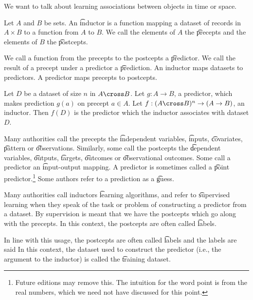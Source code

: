 

We want to talk about learning
associations between objects
in time or space.


Let $A$ and $B$ be sets.
An \t{inductor} is a function mapping a dataset of records in $A \times B$ to a function from $A$ to $B$.
We call the elements of $A$ the \t{precepts} and the elements of $B$ the \t{postcepts}.

We call a function from the precepts to the postcepts a \t{predictor}.
We call the result of a precept under a predictor a \t{prediction}.
An inductor maps datasets to predictors.
A predictor maps precepts to postcepts.


Let $D$ be a dataset of size $n$ in $A \cross B$.
Let $g: A \to B$, a predictor, which makes prediction $g(a)$ on precept $a \in A$.
Let $f: (A \cross B)^n \to (A \to B)$, an inductor.
Then $f(D)$ is the predictor which the inductor associates with dataset $D$.


Many authorities call the precepts the \t{independent variables}, \t{inputs}, \t{covariates}, \t{pattern} or \t{observations}.
Similarly, some call the postcepts the \t{dependent variables}, \t{outputs}, \t{targets}, \t{outcomes} or \t{observational outcomes}.
Some call a predictor an \t{input-output} mapping.
A predictor is sometimes called a \t{point predictor}.\footnote{Future editions may remove this. The intuition for the word point is from the real numbers, which we need not have discussed for this point.}
Some authors refer to a prediction as a \t{guess}.


Many authorities call inductors \t{learning algorithms}, and refer to \t{supervised learning} when they speak of the task or problem of constructing a predictor from a dataset.
By supervision is meant that we have the postcepts which go along with the precepts.
In this context, the postcepts are often called \t{labels}.

In line with this usage, the postcepts are often called \t{labels} and the labels are said 
In this context, the dataset used to construct the predictor (i.e., the argument to the inductor) is called the \t{training dataset}.

\blankpage
